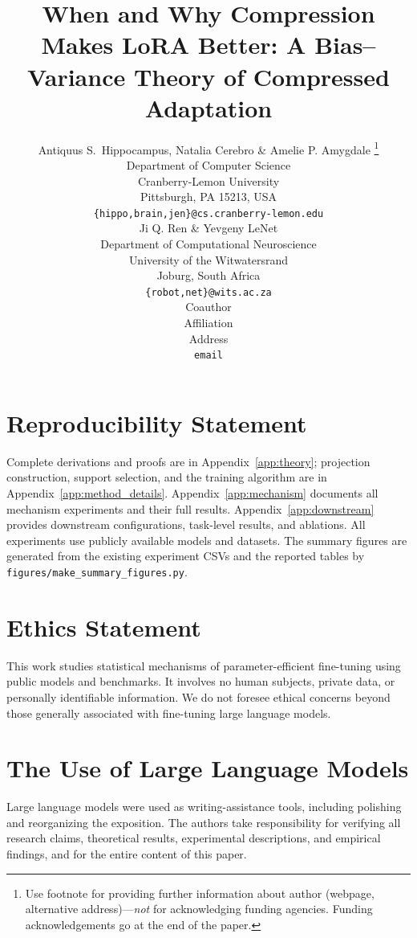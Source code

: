 \documentclass{article} %
\title{When and Why Compression Makes LoRA Better: A Bias--Variance Theory of Compressed Adaptation}
\author{Antiquus S.~Hippocampus, Natalia Cerebro \& Amelie P. Amygdale \thanks{ Use footnote for providing further information
about author (webpage, alternative address)---\emph{not} for acknowledging
funding agencies.  Funding acknowledgements go at the end of the paper.} \\
Department of Computer Science\\
Cranberry-Lemon University\\
Pittsburgh, PA 15213, USA \\
\texttt{\{hippo,brain,jen\}@cs.cranberry-lemon.edu} \\
\And
Ji Q. Ren \& Yevgeny LeNet \\
Department of Computational Neuroscience \\
University of the Witwatersrand \\
Joburg, South Africa \\
\texttt{\{robot,net\}@wits.ac.za} \\
\AND
Coauthor \\
Affiliation \\
Address \\
\texttt{email}
}
\begin{document}
\maketitle



\clearpage
\section*{Reproducibility Statement}
\label{sec:repro_stmt}
Complete derivations and proofs are in Appendix~\ref{app:theory}; projection construction, support selection, and the training algorithm are in Appendix~\ref{app:method_details}. Appendix~\ref{app:mechanism} documents all mechanism experiments and their full results. Appendix~\ref{app:downstream} provides downstream configurations, task-level results, and ablations. All experiments use publicly available models and datasets. The summary figures are generated from the existing experiment CSVs and the reported tables by \texttt{figures/make\_summary\_figures.py}.

\section*{Ethics Statement}
This work studies statistical mechanisms of parameter-efficient fine-tuning using public models and benchmarks. It involves no human subjects, private data, or personally identifiable information. We do not foresee ethical concerns beyond those generally associated with fine-tuning large language models.

\section*{The Use of Large Language Models}
\label{app:llm_usage}
Large language models were used as writing-assistance tools, including polishing and reorganizing the exposition. The authors take responsibility for verifying all research claims, theoretical results, experimental descriptions, and empirical findings, and for the entire content of this paper.



\clearpage
\appendix

\clearpage

\clearpage

\clearpage

\end{document}
